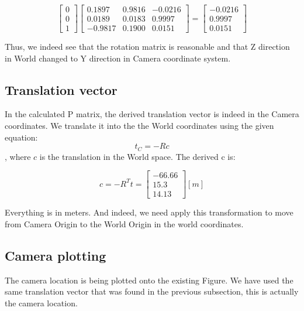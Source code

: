 \documentclass[a4paper]{iacas}
\begin{document}
\begin{equation*}
\left[
\begin{matrix}
0\\
0 \\
1
\end{matrix}
\right]
\left[
\begin{matrix}
    0.1897  &  0.9816  & -0.0216\\
    0.0189  &  0.0183  &  0.9997\\
   -0.9817  &  0.1900  &  0.0151
\end{matrix}
\right]
= 
\left[
\begin{matrix}
   -0.0216\\
    0.9997\\
    0.0151
\end{matrix}
\right]
\end{equation*}

Thus, we indeed see that the rotation matrix is reasonable and that Z direction in World changed to Y direction in Camera coordinate system.


\subsection{Translation vector}
In the calculated P matrix, the derived translation vector is indeed in the Camera coordinates. We translate it into the the World coordinates using the given equation: $$t_{C} = -Rc$$, where $c$ is the translation in the World space. The derived c is:

\begin{equation*}
c = -R^{T}t = 
\left[
\begin{matrix}
-66.66\\
15.3\\
14.13
\end{matrix}
\right] [m]
\end{equation*}

Everything is in meters. And indeed, we need apply this transformation to move from Camera Origin to the World Origin in the world coordinates.

\subsection{Camera plotting}
The camera location is being plotted onto the existing Figure. We have used the same translation vector that was found in the previous subsection, this is actually the camera location.
\end{document}
